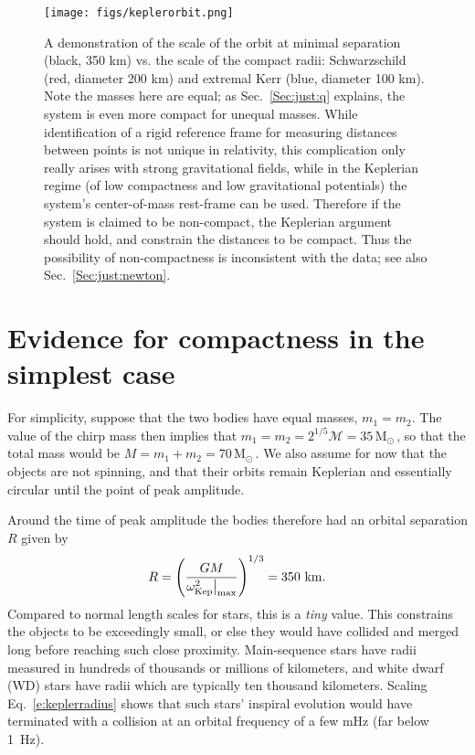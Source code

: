 \documentclass{andp2012}%
\def\w{\omega}
\def\({\left(}
\def\){\right)}
\newcommand{\refsec}[1]{Sec.\ \ref{#1}}
\newcommand{\refeqn}[1]{Eq.\ \ref{#1}}
\def\Mc{\mathcal{M}}
\def\submax{\big|_{\rm max}}
\def\wkep{\w_{\rm Kep}}
\newcommand{\Msun}{\ensuremath{\mathrm{M}_\odot\,}}
\newcommand{\MCOMPONENTAPPROX}{\ensuremath{35\, \Msun}}
\newcommand{\MFINALAPPROX}{\ensuremath{70\, \Msun}}
\newcommand{\ORBITALSEPAPPROX}{\ensuremath{350}} %
\begin{document}
\begin{figure}
\texttt{[image: figs/keplerorbit.png]}
\centering
\caption{A demonstration of the scale of the orbit at minimal
  separation (black, 350 km) vs. the scale of the compact radii:
  Schwarzschild (red, diameter 200 km)
  and extremal Kerr (blue, diameter 100 km).
  Note the masses here are equal;
  as \refsec{Sec:just:q} explains,
  the system is even more compact for unequal masses.
%
  While identification of a rigid reference frame for
  measuring distances between points is not unique in relativity,
  this complication only really arises with strong gravitational fields,
  while in the Keplerian regime
  (of low compactness and low gravitational potentials)
  the system's center-of-mass rest-frame can be used.
  Therefore if the system is claimed to be non-compact,
  the Keplerian argument should hold,
  and constrain the distances to be compact.
  Thus the possibility of non-compactness
  is inconsistent with the data;
  see also \refsec{Sec:just:newton}.
}
\label{fig:tightorbit}
\end{figure}

\section{Evidence for compactness in the simplest case}
\label{Sec:basic}

For simplicity, suppose that the two bodies have equal masses, $m_1 =
m_2$. The value of the chirp mass then implies that $m_1 = m_2 =
2^{1/5} \Mc = \MCOMPONENTAPPROX$, so that the total mass would be $M=m_1 + m_2 =
\MFINALAPPROX$.
We also assume for now that the objects are not spinning, and that their orbits remain
Keplerian and essentially circular until the point of peak amplitude.

Around the time of peak amplitude the bodies therefore had an orbital separation $R$ given by
\begin{equation}
  R = \( \frac{G M}{\wkep^2\submax} \)^{1/3} = \ORBITALSEPAPPROX~\rm{km}.
  \label{e:keplerradius}
\end{equation}
%
Compared to normal length scales for stars, this is a {\it tiny} value.
This constrains the objects to be exceedingly small,
or else they would have collided and merged
long before reaching such close proximity.
Main-sequence stars have radii measured in hundreds of thousands or millions of kilometers,
and white dwarf (WD) stars have radii which are typically ten thousand kilometers.
Scaling \refeqn{e:keplerradius} shows that such stars' inspiral evolution
would have terminated with a collision at an orbital frequency of a few mHz (far below 1~Hz).
\end{document}
